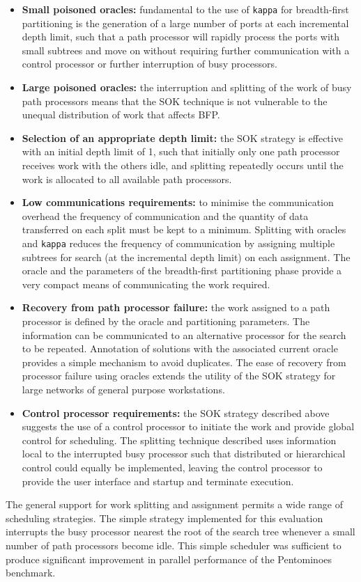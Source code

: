 \begin{itemize}
\item{\textbf{Small poisoned oracles:} fundamental to the use of \texttt{kappa}
  for breadth-first partitioning is the generation of a large number of ports at
  each incremental depth limit, such that a path processor will rapidly process
  the ports with small subtrees and move on without requiring further communication
  with a control processor or further interruption of busy processors.}
\item{\textbf{Large poisoned oracles:} the interruption and splitting of the work of 
  busy path processors means that the SOK technique is not vulnerable to the
  unequal distribution of work that affects BFP.}
\item{\textbf{Selection of an appropriate depth limit:} the SOK strategy is effective
  with an initial depth limit of 1, such that initially only one path processor
  receives work with the others idle, and splitting repeatedly occurs until
  the work is allocated to all available path processors.}
\item{\textbf{Low communications requirements:} to minimise the communication
  overhead the frequency of communication and the quantity of data transferred
  on each split must be kept to a minimum.  Splitting with oracles and \texttt{kappa}
  reduces the frequency of communication by assigning multiple subtrees for
  search (at the incremental depth limit) on each assignment.  The oracle and
  the parameters of the breadth-first partitioning phase provide a very
  compact means of communicating the work required.}
\item{\textbf{Recovery from path processor failure:} the work assigned to a path
  processor is defined by the oracle and partitioning parameters.  The information
  can be communicated to an alternative processor for the search to be repeated.
  Annotation of solutions with the associated current oracle provides a simple
  mechanism to avoid duplicates.  The ease of recovery from
  processor failure using oracles extends the utility of the SOK strategy for
  large networks of general purpose workstations.}
\item{\textbf{Control processor requirements:} the SOK strategy described above
  suggests the use of a control processor to initiate the work and provide global
  control for scheduling.  The splitting technique described uses information local
  to the interrupted busy processor such that distributed or hierarchical
  control could equally be implemented, leaving the control processor to provide the
  user interface and startup and terminate execution.}
\end{itemize}

The general support for work splitting and assignment permits a wide range
of scheduling strategies.  The simple strategy implemented for this 
evaluation interrupts the busy processor nearest the root of the search tree
whenever a small number of path processors become idle.  This simple
scheduler
was sufficient to produce significant improvement in parallel performance
of the Pentominoes benchmark.

